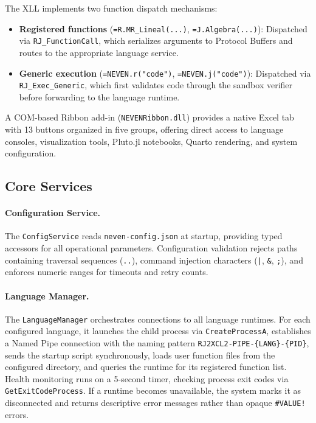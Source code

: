 \documentclass[preprint,12pt,authoryear]{elsarticle}
\begin{document}
The XLL implements two function dispatch mechanisms:
\begin{itemize}
    \item \textbf{Registered functions} (\texttt{=R.MR\_Lineal(...)}, \texttt{=J.Algebra(...)}): Dispatched via \texttt{RJ\_FunctionCall}, which serializes arguments to Protocol Buffers and routes to the appropriate language service.
    \item \textbf{Generic execution} (\texttt{=NEVEN.r("code")}, \texttt{=NEVEN.j("code")}): Dispatched via \texttt{RJ\_Exec\_Generic}, which first validates code through the sandbox verifier before forwarding to the language runtime.
\end{itemize}

A COM-based Ribbon add-in (\texttt{NEVENRibbon.dll}) provides a native Excel tab with 13 buttons organized in five groups, offering direct access to language consoles, visualization tools, Pluto.jl notebooks, Quarto rendering, and system configuration.

\subsection{Core Services}

\paragraph{Configuration Service.}
The \texttt{ConfigService} reads \texttt{neven-config.json} at startup, providing typed accessors for all operational parameters. Configuration validation rejects paths containing traversal sequences (\texttt{..}), command injection characters (\texttt{|}, \texttt{\&}, \texttt{;}), and enforces numeric ranges for timeouts and retry counts.

\paragraph{Language Manager.}
The \texttt{LanguageManager} orchestrates connections to all language runtimes. For each configured language, it launches the child process via \texttt{CreateProcessA}, establishes a Named Pipe connection with the naming pattern \texttt{RJ2XCL2-PIPE-\{LANG\}-\{PID\}}, sends the startup script synchronously, loads user function files from the configured directory, and queries the runtime for its registered function list. Health monitoring runs on a 5-second timer, checking process exit codes via \texttt{GetExitCodeProcess}. If a runtime becomes unavailable, the system marks it as disconnected and returns descriptive error messages rather than opaque \texttt{\#VALUE!} errors.
\end{document}
